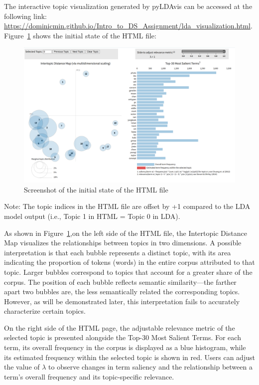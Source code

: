 \documentclass[12pt]{article}
\begin{document}
	The interactive topic visualization generated by pyLDAvis can be accessed at the following link: \url{https://dominicmin.github.io/Intro_to_DS_Assignment/lda_visualization.html}. Figure~\ref{fig:HTML} shows the initial state of the HTML file: 
	
		\begin{figure}[H]
			\centering
			\includegraphics[width=1\textwidth]{Q2html0} 
			\caption{\centering Screenshot of the initial state of the HTML file}	
			\label{fig:HTML}	
		\end{figure}
	Note: The topic indices in the HTML file are offset by +1 compared to the LDA model output (i.e., Topic 1 in HTML = Topic 0 in LDA).
	
	As shown in Figure~\ref{fig:HTML},on the left side of the HTML file, the Intertopic Distance Map visualizes the relationships between topics in two dimensions. A possible interpretation is that each bubble represents a distinct topic, with its area indicating the proportion of tokens (words) in the entire corpus attributed to that topic. Larger bubbles correspond to topics that account for a greater share of the corpus. The position of each bubble reflects semantic similarity—the farther apart two bubbles are, the less semantically related the corresponding topics. However, as will be demonstrated later, this interpretation fails to accurately characterize certain topics.
	
	On the right side of the HTML page, the adjustable relevance metric of the selected topic is presented alongside the Top-30 Most Salient Terms. For each term, its overall frequency in the corpus is displayed as a blue histogram, while its estimated frequency within the selected topic is shown in red. Users can adjust the value of $\lambda$ to observe changes in term saliency and the relationship between a term’s overall frequency and its topic-specific relevance. 
	
\end{document}
